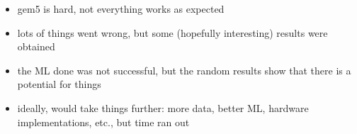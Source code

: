 \begin{itemize}
    \item gem5 is hard, not everything works as expected
    \item lots of things went wrong, but some (hopefully interesting) results 
          were obtained
    \item the ML done was not successful, but the random results show that there
          is a potential for things
    \item ideally, would take things further: more data, better ML, hardware
          implementations, etc., but time ran out
\end{itemize}
